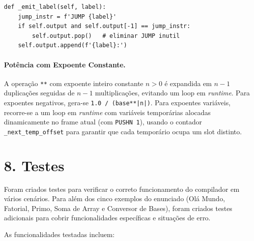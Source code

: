 \documentclass[a4paper]{article}
\begin{document}
\vspace{0.2cm}

\begin{lstlisting}[style=py]
def _emit_label(self, label):
    jump_instr = f'JUMP {label}'
    if self.output and self.output[-1] == jump_instr:
        self.output.pop()   # eliminar JUMP inutil
    self.output.append(f'{label}:')
\end{lstlisting}

\paragraph{Potência com Expoente Constante.} A operação \texttt{**} com expoente inteiro constante $n > 0$ é expandida em $n-1$ duplicações seguidas de $n-1$ multiplicações, evitando um loop em \textit{runtime}. Para expoentes negativos, gera-se \texttt{1.0 / (base**|n|)}. Para expoentes variáveis, recorre-se a um loop em \textit{runtime} com variáveis temporárias alocadas dinamicamente no frame atual (com \texttt{PUSHN 1}), usando o contador \texttt{\_next\_temp\_offset} para garantir que cada temporário ocupa um slot distinto.

\section*{8. Testes}

\noindent Foram criados testes para verificar o correto funcionamento do compilador em vários cenários. Para além dos cinco exemplos do enunciado (Olá Mundo, Fatorial, Primo, Soma de Array e Conversor de Bases), foram criados testes adicionais para cobrir funcionalidades específicas e situações de erro.

\vspace{0.2cm}

\noindent As funcionalidades testadas incluem:
\end{document}
